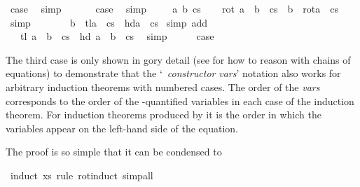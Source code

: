 \begin{isabellebody}
\ {\isacharquery}case\ \isamarkupfalse%
\ simp\isanewline
{}\isamarkupfalse%
\isanewline
\ \ \isamarkupfalse%
\ {}\ \isamarkupfalse%
\ {\isacharquery}case\ \isamarkupfalse%
\ simp\isanewline
{}\isamarkupfalse%
\isanewline
\ \ \isamarkupfalse%
\ {\isacharparenleft}{}\ a\ b\ cs{\isacharparenright}\isanewline
\ \ \isamarkupfalse%
\ {\isachardoublequoteopen}rot\ {\isacharparenleft}a\ {\isacharhash}\ b\ {\isacharhash}\ cs{\isacharparenright}\ {\isacharequal}\ b\ {\isacharhash}\ rot{\isacharparenleft}a\ {\isacharhash}\ cs{\isacharparenright}{\isachardoublequoteclose}\ \isamarkupfalse%
\ simp\isanewline
\ \ \isamarkupfalse%
\ \isamarkupfalse%
\ {\isachardoublequoteopen}{\isasymdots}\ {\isacharequal}\ b\ {\isacharhash}\ tl{\isacharparenleft}a\ {\isacharhash}\ cs{\isacharparenright}\ {\isacharat}\ {\isacharbrackleft}hd{\isacharparenleft}a\ {\isacharhash}\ cs{\isacharparenright}{\isacharbrackright}{\isachardoublequoteclose}\ \isamarkupfalse%
{\isacharparenleft}simp\ add{\isacharcolon}{}{\isacharparenright}\isanewline
\ \ \isamarkupfalse%
\ \isamarkupfalse%
\ {\isachardoublequoteopen}{\isasymdots}\ {\isacharequal}\ tl\ {\isacharparenleft}a\ {\isacharhash}\ b\ {\isacharhash}\ cs{\isacharparenright}\ {\isacharat}\ {\isacharbrackleft}hd\ {\isacharparenleft}a\ {\isacharhash}\ b\ {\isacharhash}\ cs{\isacharparenright}{\isacharbrackright}{\isachardoublequoteclose}\ \isamarkupfalse%
\ simp\isanewline
\ \ \isamarkupfalse%
\ \isamarkupfalse%
\ {\isacharquery}case\ \isacommand{{\isachardot}}\isamarkupfalse%
\isanewline
{}\isamarkupfalse%
%
\endisatagproof
{\isafoldproof}%
%
\isadelimproof
%
\endisadelimproof
%
\begin{isamarkuptext}%
\noindent
The third case is only shown in gory detail (see \cite{BauerW-TPHOLs01}
for how to reason with chains of equations) to demonstrate that the
`~\isa{(}\emph{constructor} \emph{vars}\isa{)}' notation also
works for arbitrary induction theorems with numbered cases. The order
of the \emph{vars} corresponds to the order of the
\isa{{\isasymAnd}}-quantified variables in each case of the induction
theorem. For induction theorems produced by  it is
the order in which the variables appear on the left-hand side of the
equation.

The proof is so simple that it can be condensed to%
\end{isamarkuptext}%
\isamarkuptrue%
%
\isadelimproof
%
\endisadelimproof
%
\isatagproof
{}\isamarkupfalse%
\ {\isacharparenleft}induct\ xs\ rule{\isacharcolon}\ rot{\isachardot}induct{\isacharcomma}\ simp{\isacharunderscore}all{\isacharparenright}\isanewline
%
\endisatagproof
{\isafoldproof}%
%
\isadelimproof
%
\endisadelimproof
%
\isadelimtheory
%
\endisadelimtheory
%
\isatagtheory
%
\endisatagtheory
{\isafoldtheory}%
%
\isadelimtheory
%
\endisadelimtheory
\end{isabellebody}%
